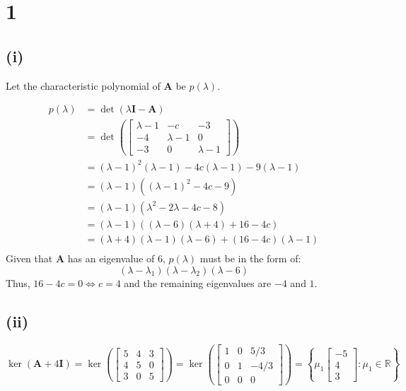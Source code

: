 \documentclass[a4paper]{article}
\newcommand{\vv}{\mathbf}
\begin{document}
\section*{1}
\subsection*{(i)}

Let the characteristic polynomial of \(\vv A\) be \(p(\lambda)\).

\[\begin{aligned}
	p(\lambda)&=\det(\lambda\vv I-\vv A)\\
	&=\det\left(\begin{bmatrix}
			\lambda-1&-c&-3\\
			-4&\lambda-1&0\\
			-3&0&\lambda-1
	\end{bmatrix}\right)\\
	&=(\lambda-1)^2(\lambda-1)-4c(\lambda-1)-9(\lambda-1)\\
	&=(\lambda-1)\left((\lambda-1)^2-4c-9\right)\\
	&=(\lambda-1)\left(\lambda^2-2\lambda-4c-8\right)\\
	&=(\lambda-1)((\lambda-6)(\lambda+4)+16-4c)\\
	&=(\lambda+4)(\lambda-1)(\lambda-6)+(16-4c)(\lambda-1)\\
\end{aligned}\]
Given that \(\vv A\) has an eigenvalue of 6, \(p(\lambda)\) must be in the form of:
\[(\lambda-\lambda_1)(\lambda-\lambda_2)(\lambda-6)\]
Thus, \(16-4c=0\iff c=\boxed4\) and the remaining eigenvalues are
\(\boxed{-4}\) and \(\boxed1\).

\subsection*{(ii)}
\[\ker(\vv A+4\vv I)=\ker\left(\begin{bmatrix}
		5&4&3\\
		4&5&0\\
		3&0&5
		\end{bmatrix}\right)=\ker\left(\begin{bmatrix}
		1&0&5/3\\
		0&1&-4/3\\
		0&0&0
	\end{bmatrix}\right)=\left\{\mu_1\begin{bmatrix}-5\\4\\3\end{bmatrix}:\mu_1\in\mathbb R\right\}\]
\end{document}
